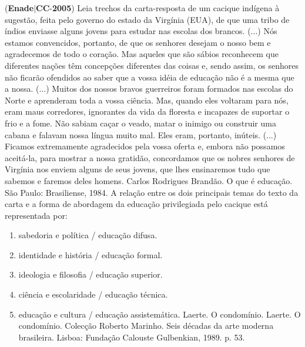 \documentclass{exam}
\begin{document}
\begin{questions}
\question (\textbf{Enade}$|$\textbf{CC}-\textbf{2005}) Leia trechos da carta-resposta de um cacique indígena à sugestão, feita pelo governo do estado da Virgínia (EUA), de que uma tribo
de índios enviasse alguns jovens para estudar nas escolas dos brancos.
(...) Nós estamos convencidos, portanto, de que os senhores desejam o nosso bem e agradecemos de todo o coração. Mas
aqueles que são sábios reconhecem que diferentes nações têm concepções diferentes das coisas e, sendo assim, os senhores não
ficarão ofendidos ao saber que a vossa idéia de educação não é a mesma que a nossa. (...) Muitos dos nossos bravos guerreiros
foram formados nas escolas do Norte e aprenderam toda a vossa ciência. Mas, quando eles voltaram para nós, eram maus
corredores, ignorantes da vida da floresta e incapazes de suportar o frio e a fome. Não sabiam caçar o veado, matar o inimigo ou
construir uma cabana e falavam nossa língua muito mal. Eles eram, portanto, inúteis. (...) Ficamos extremamente agradecidos pela
vossa oferta e, embora não possamos aceitá-la, para mostrar a nossa gratidão, concordamos que os nobres senhores de Virgínia
nos enviem alguns de seus jovens, que lhes ensinaremos tudo que sabemos e faremos deles homens.
Carlos Rodrigues Brandão. O que é educação. São Paulo: Brasiliense, 1984.
A relação entre os dois principais temas do texto da carta e a forma de abordagem da educação privilegiada pelo cacique está
representada por:
	\begin{enumerate}[label=\alph*)]
		\item  sabedoria e política / educação difusa.
		\item  identidade e história / educação formal.
		\item  ideologia e filosofia / educação superior.
		\item  ciência e escolaridade / educação técnica.
		\item  educação e cultura / educação assistemática.
Laerte. O condomínio.
Laerte. O condomínio.
Colecção Roberto Marinho. Seis décadas da arte moderna
brasileira. Lisboa: Fundação Calouste Gulbenkian, 1989. p. 53.

	\end{enumerate}


\end{questions}
\end{document}
